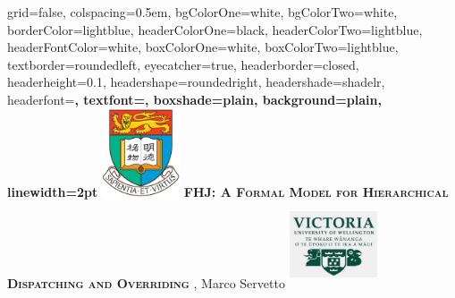 \documentclass[portrait,final,a0paper,fontscale=0.277]{baposter}
\begin{document}
\begin{poster}%
  {
  grid=false,
  colspacing=0.5em,
  bgColorOne=white,
  bgColorTwo=white,
  borderColor=lightblue,
  headerColorOne=black,
  headerColorTwo=lightblue,
  headerFontColor=white,
  boxColorOne=white,
  boxColorTwo=lightblue,
  textborder=roundedleft,
  eyecatcher=true,
  headerborder=closed,
  headerheight=0.1\textheight,
  headershape=roundedright,
  headershade=shadelr,
  headerfont=\Large\bf\textsc, %
  textfont={\setlength{\parindent}{1.5em}},
  boxshade=plain,
  background=plain,
  linewidth=2pt
  }
  {\includegraphics[height=7em]{pdfs/hku.png}}
  {\bf\textsc{FHJ: A Formal Model for Hierarchical Dispatching and Overriding}\vspace{0.1em}}
  { {,} Marco Servetto }
  {%
    \includegraphics[width=7em,height=7em]{pdfs/vuw.png}
  }


    \newcommand{\colouredcircle}{%
      \tikz{\useasboundingbox (-0.2em,-0.32em) rectangle(0.2em,0.32em); \draw[draw=black,fill=lightblue,line width=0.03em] (0,0) circle(0.18em);}}


\end{poster}
\end{document}

